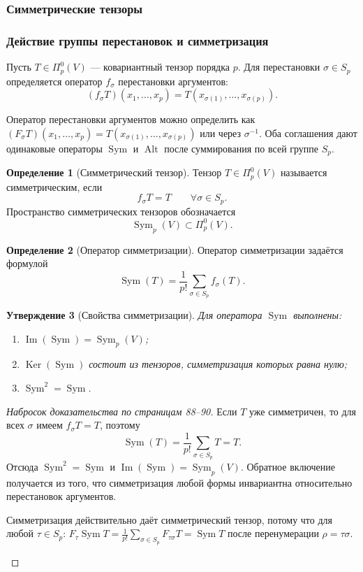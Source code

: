 \documentclass[12pt,a4paper]{article}
\theoremstyle{definition}
\newtheorem{definition}{Определение}[section]
\theoremstyle{plain}
\newtheorem{proposition}[definition]{Утверждение}
\theoremstyle{remark}
\newenvironment{knowledgefix}{\begin{clarifybox}}{\end{clarifybox}}
\newcommand{\Ker}{\operatorname{Ker}}
\newcommand{\Imop}{\operatorname{Im}}
\newcommand{\Sym}{\operatorname{Sym}}
\newcommand{\Alt}{\operatorname{Alt}}
\begin{document}
\subsubsection{Симметрические тензоры}

\subsubsection*{Действие группы перестановок и симметризация}

Пусть $T\in\Pi^0_p(V)$ --- ковариантный тензор порядка $p$.
Для перестановки $\sigma\in S_p$ определяется оператор $f_\sigma$ перестановки аргументов:
\[
    (f_\sigma T)(x_1,\ldots,x_p)
    =
    T(x_{\sigma(1)},\ldots,x_{\sigma(p)}).
\]
\begin{knowledgefix}
Оператор перестановки аргументов можно определить как \((F_\sigma T)(x_1,
\ldots,x_p)=T(x_{\sigma(1)},\ldots,x_{\sigma(p)})\) или через \(\sigma^{-1}\). Оба соглашения дают одинаковые операторы \(\Sym\) и \(\Alt\) после суммирования по всей группе \(S_p\).
\end{knowledgefix}

\begin{definition}[Симметрический тензор]
Тензор $T\in\Pi^0_p(V)$ называется симметрическим, если
\[
    f_\sigma T=T
    \qquad
    \forall\sigma\in S_p.
\]
Пространство симметрических тензоров обозначается
\[
    \Sym_p(V)\subset \Pi^0_p(V).
\]
\end{definition}

\begin{definition}[Оператор симметризации]
Оператор симметризации задаётся формулой
\[
    \Sym(T)=\frac{1}{p!}\sum_{\sigma\in S_p} f_\sigma(T).
\]
\end{definition}

\begin{proposition}[Свойства симметризации]
Для оператора $\Sym$ выполнены:
\begin{enumerate}[label=\arabic*)]
    \item $\Imop(\Sym)=\Sym_p(V)$;
    \item $\Ker(\Sym)$ состоит из тензоров, симметризация которых равна нулю;
    \item $\Sym^2=\Sym$.
\end{enumerate}
\end{proposition}

\begin{proof}[Набросок доказательства по страницам 88--90]
Если $T$ уже симметричен, то для всех $\sigma$ имеем $f_\sigma T=T$, поэтому
\[
    \Sym(T)=\frac{1}{p!}\sum_{\sigma\in S_p}T=T.
\]
Отсюда $\Sym^2=\Sym$ и $\Imop(\Sym)=\Sym_p(V)$.
Обратное включение получается из того, что симметризация любой формы инвариантна относительно перестановок аргументов.
\begin{knowledgefix}
Симметризация действительно даёт симметрический тензор, потому что для любой \(\tau\in S_p\): \(F_\tau\Sym T=\frac1{p!}\sum_{\sigma\in S_p}F_{\tau\sigma}T=\Sym T\) после перенумерации \(\rho=\tau\sigma\).
\end{knowledgefix}
\end{proof}
\end{document}
